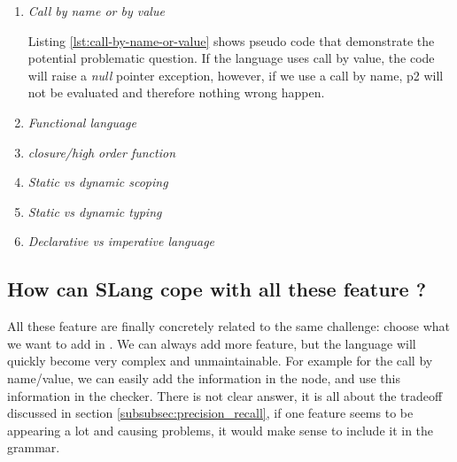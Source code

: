 \begin{enumerate}
	\item \textit{Call by name or by value} \newline
	
	
	Listing \ref{lst:call-by-name-or-value} shows pseudo code that demonstrate the potential problematic question. If the language uses call by value, the code will raise a \emph{null} pointer exception, however, if we use a call by name, p2 will not be evaluated and therefore nothing wrong happen. \newline
	\item \textit{Functional language} \newline
	\item \textit{closure/high order function} \newline
	\item \textit{Static vs dynamic scoping} \newline
	\item \textit{Static vs dynamic typing} \newline
	\item \textit{Declarative vs imperative language} \newline
\end{enumerate}

\subsection{How can SLang cope with all these feature ?}
\label{subsec:how_can_slang_cope_with_features}

All these feature are finally concretely related to the same challenge: choose what we want to add in \slang{}. 
We can always add more feature, but the language will quickly become very complex and unmaintainable. For example for the call by name/value, we can easily add the information in the node, and use this information in the checker. 
There is not clear answer, it is all about the tradeoff discussed in section \ref{subsubsec:precision_recall}, if one feature seems to be appearing a lot and causing problems, it would make sense to include it in the grammar.
